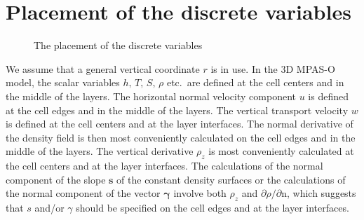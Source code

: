 \documentclass[12pt]{report}
\def\p{\partial}
\def\bs{\boldsymbol}
\begin{document}
\section{Placement of the discrete variables}\label{sec:plac-discr-vari}
\begin{figure}[h]
  \centering
  \caption{The placement of the discrete variables}
  \label{fig:1}
\end{figure}
We assume that a general vertical coordinate $r$ is in use. In the 3D
MPAS-O model, the scalar variables $h,\, T,\, S,\, \rho$ etc.~are
defined at the cell centers and in the middle of the layers. The
horizontal normal velocity component $u$ is defined at the cell edges
and in the middle of the layers. The vertical transport velocity $w$
is defined at the cell centers and at the layer interfaces. The normal
derivative of the density field is then most conveniently calculated
on the cell edges and in the middle of the layers. The vertical
derivative $\rho_z$ is most conveniently calculated at the cell
centers and at the layer interfaces. The calculations of the normal
component of the slope $\bs{s}$ of the constant density surfaces or
the calculations of the normal component of the vector $\bs{\gamma}$
involve both $\rho_z$ and $\p\rho/\p\mathrm{n}$, which suggests that
$s$ and/or $\gamma$ should be specified on the cell edges and at the
layer interfaces. 
\end{document}
